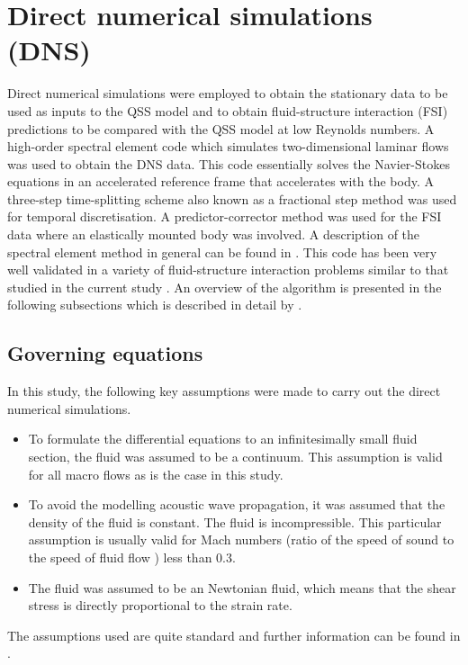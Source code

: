 \section{Direct numerical simulations (DNS)}

Direct numerical simulations were employed to obtain the stationary data to be used as inputs to the QSS model and to obtain  fluid-structure interaction (FSI) predictions to be compared with the QSS model at low Reynolds numbers. A high-order spectral element code which simulates two-dimensional laminar flows was used to obtain the DNS data. This code essentially solves the Navier-Stokes equations in an accelerated reference frame that accelerates with the body. A three-step time-splitting scheme also known as a fractional step method was used for temporal discretisation. A predictor-corrector method was used for the FSI data where an elastically mounted body was involved. A description of the spectral element method in general can be found in \citet{karniadakis2005}. This code has been very well validated in a variety of fluid-structure interaction problems similar to that studied in the current study \citep{Leontini2007a,Griffith2011,Leontini2011,Leontini2013}. An overview of the algorithm is presented in the following subsections which is described in detail by \citet{Leontini:thesis}. 

\subsection{Governing equations}
 
  In this study, the following key assumptions were made to carry out the direct numerical simulations. 
  \begin{itemize}
  \item To formulate the differential equations to an infinitesimally small fluid section, the fluid was assumed to be a continuum. This assumption is valid for all macro flows as  is the case in this study. 
 \item To avoid the modelling acoustic wave propagation, it was assumed that the density of the fluid is constant. The fluid is incompressible. This particular assumption is usually valid for Mach numbers (ratio of the speed of sound to the speed of fluid flow ) less than 0.3.
 \item The fluid was assumed to be an Newtonian fluid, which means that the shear stress is directly proportional to the strain rate.
\end{itemize}
The assumptions used are quite standard and further information can be found in \citet{White99}.        

